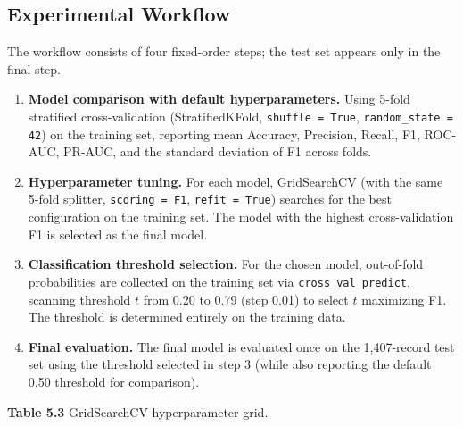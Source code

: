 \subsection{ Experimental Workflow}

The workflow consists of four fixed-order steps; the test set appears only in the final step.

\begin{enumerate}
    \item \textbf{Model comparison with default hyperparameters.} Using 5-fold stratified cross-validation (StratifiedKFold, \texttt{shuffle = True}, \texttt{random\_state = 42}) on the training set, reporting mean Accuracy, Precision, Recall, F1, ROC-AUC, PR-AUC, and the standard deviation of F1 across folds.
    \item \textbf{Hyperparameter tuning.} For each model, GridSearchCV (with the same 5-fold splitter, \texttt{scoring = F1}, \texttt{refit = True}) searches for the best configuration on the training set. The model with the highest cross-validation F1 is selected as the final model.
    \item \textbf{Classification threshold selection.} For the chosen model, out-of-fold probabilities are collected on the training set via \texttt{cross\_val\_predict}, scanning threshold $t$ from 0.20 to 0.79 (step 0.01) to select $t$ maximizing F1. The threshold is determined entirely on the training data.
    \item \textbf{Final evaluation.} The final model is evaluated once on the 1,407-record test set using the threshold selected in step 3 (while also reporting the default 0.50 threshold for comparison).
\end{enumerate}

\vspace{0.5em}
\noindent\textbf{Table 5.3} GridSearchCV hyperparameter grid.

